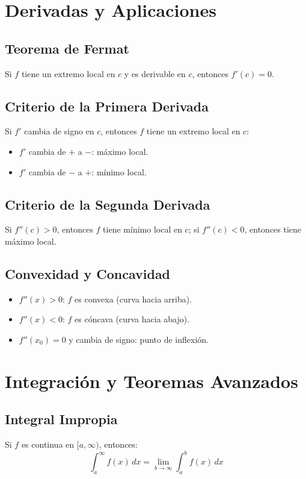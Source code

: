 \documentclass[12pt]{article}
\begin{document}
\section{Derivadas y Aplicaciones}

\subsection{Teorema de Fermat}
Si $f$ tiene un extremo local en $c$ y es derivable en $c$, entonces $f'(c) = 0$.

\subsection{Criterio de la Primera Derivada}
Si $f'$ cambia de signo en $c$, entonces $f$ tiene un extremo local en $c$:
\begin{itemize}
  \item $f'$ cambia de $+$ a $-$: máximo local.
  \item $f'$ cambia de $-$ a $+$: mínimo local.
\end{itemize}

\subsection{Criterio de la Segunda Derivada}
Si $f''(c) > 0$, entonces $f$ tiene mínimo local en $c$; si $f''(c) < 0$, entonces tiene máximo local.

\subsection{Convexidad y Concavidad}
\begin{itemize}
  \item $f''(x) > 0$: $f$ es convexa (curva hacia arriba).
  \item $f''(x) < 0$: $f$ es cóncava (curva hacia abajo).
  \item $f''(x_0) = 0$ y cambia de signo: punto de inflexión.
\end{itemize}

\section{Integración y Teoremas Avanzados}

\subsection{Integral Impropia}
Si $f$ es continua en $[a,\infty)$, entonces:
\[
\int_a^\infty f(x)\,dx = \lim_{b \to \infty} \int_a^b f(x)\,dx
\]
\end{document}
